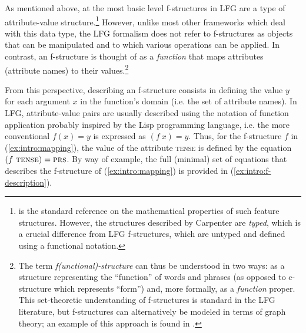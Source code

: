\documentclass[output=paper]{langscibook}
\begin{document}
  As mentioned above, at the most basic level f-structures in LFG are a type of attribute-value structure.\footnote{\textcite{carpenter1992} is the standard reference on the mathematical properties of such feature structures. However, the structures described by Carpenter are \textit{typed}, which is a crucial difference from LFG f-structures, which are untyped and defined using a functional notation.} However, unlike most other frameworks which deal with this data type, the LFG formalism does not refer to f-structures as objects that can be manipulated and to which various operations can be applied. In contrast, an f-structure is thought of as a \textit{function} that maps attributes (attribute names) to their values.\footnote{The term \textit{f(unctional)-structure} can thus be understood in two ways: as a structure representing the ``function'' of words and phrases (as opposed to c-structure which represents ``form'') and, more formally, as a \textit{function} proper. This set-theoretic understanding of f-structures is standard in the LFG literature, but f-structures can alternatively be modeled in terms of graph theory; an example of this approach is found in \textcite{Kuhn-CSLI-book}.}
   
 From this perspective, describing an f-structure consists in defining the value $y$ for each argument $x$ in the function's domain (i.e. the set of attribute names). In LFG, attribute-value pairs are usually described using the notation of function application probably inspired by the Lisp programming language, i.e. the more conventional $f(x) = y$ is expressed as $(f~x) = y$. Thus, for the f-structure $f$ in (\ref{ex:intro:mapping}), the value of the attribute \textsc{tense} is defined by the equation $(f~\textsc{tense}{})=\textsc{prs}{}$. By way of example, the full (minimal) set of equations that describes the f-structure of (\ref{ex:intro:mapping}) is provided in (\ref{ex:intro:f-description}).
 
\end{document}
